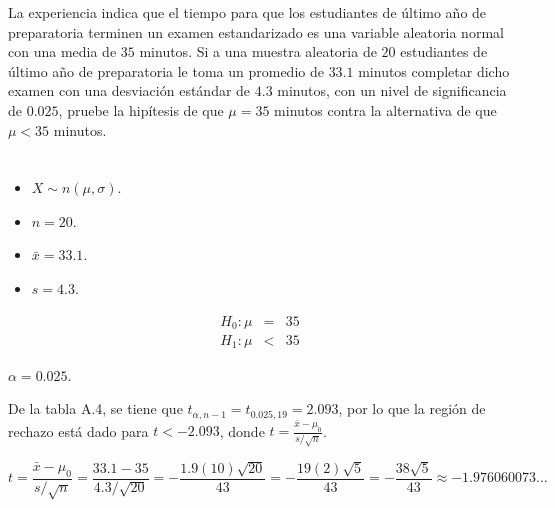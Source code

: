 \begin{enunciado}
 La experiencia indica que el tiempo para que los estudiantes de \'ultimo a\~no de preparatoria terminen un examen estandarizado es una variable aleatoria normal con una media de $35$ minutos. Si a una muestra aleatoria de $20$ estudiantes de \'ultimo a\~no de preparatoria le toma un promedio de $33.1$ minutos completar dicho examen con una desviaci\'on est\'andar de $4.3$ minutos, con un nivel de significancia de $0.025$, pruebe la hip\'itesis de que $\mu = 35$ minutos contra la alternativa de que $\mu < 35$ minutos.
\end{enunciado}

\begin{solucion}
 \begin{datos}
  $\phantom{0}$
  \begin{itemize}
   \item $X \sim n\left( \mu, \sigma \right)$.
   \item $n = 20$.
   \item $\bar{x} = 33.1$.
   \item $s = 4.3$.
  \end{itemize}
 \end{datos}

 \begin{hipotesis}
  \begin{eqnarray*}
   H_0: \mu & = & 35 \\
   H_1: \mu & < & 35
  \end{eqnarray*}
 \end{hipotesis}

 \begin{significancia}
  $\alpha = 0.025$.
 \end{significancia}

 \begin{region}
  De la tabla A.4, se tiene que $t_{\alpha,n-1} = t_{0.025,19} = 2.093$, por lo que la regi\'on de rechazo est\'a dado para $t < -2.093$, donde $t = \frac{\bar{x} - \mu_0}{s/\sqrt{n}}$.
 \end{region}

 \begin{estadistico}
  \begin{equation*}
   t = \frac{\bar{x} - \mu_0}{s/\sqrt{n}} = \frac{33.1 - 35}{4.3/\sqrt{20}} = - \frac{1.9(10)\sqrt{20}}{43} = - \frac{19(2)\sqrt{5}}{43} = - \frac{38\sqrt{5}}{43} \approx -1.976060073\ldots
  \end{equation*}
 \end{estadistico}


\end{solucion}
